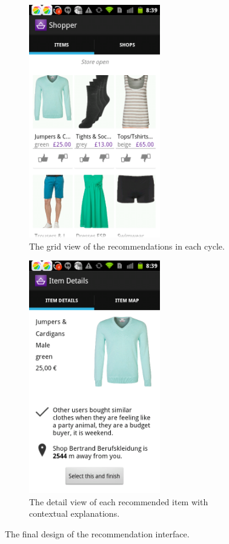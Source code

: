 \begin{figure}[H]
\centering
\begin{subfigure}{.5\textwidth}
  \centering
  \includegraphics[height=4in]{figures/recommlist.png}
  \caption{The grid view of the recommendations in each cycle.}
  \label{fig:recomm1}
\end{subfigure}%
\begin{subfigure}{.5\textwidth}
  \centering
  \includegraphics[height=4in]{figures/recommdetail.png}
  \caption{The detail view of each recommended item with contextual explanations.}
  \label{fig:recomm2}
\end{subfigure}
\caption{The final design of the recommendation interface.}
\label{fig:recomm}
\end{figure}

